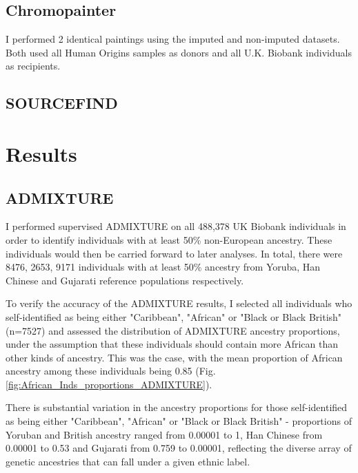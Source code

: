 \subsection{Chromopainter}

I performed 2 identical paintings using the imputed and non-imputed datasets. Both used all Human Origins samples as donors and all U.K. Biobank individuals as recipients. 

\subsection{SOURCEFIND}

\section{Results}

\subsection{ADMIXTURE}

I performed supervised ADMIXTURE on all 488,378 UK Biobank individuals in order to identify individuals with at least 50\% non-European ancestry. These individuals would then be carried forward to later analyses. In total, there were 8476, 2653, 9171 individuals with at least 50\% ancestry from Yoruba, Han Chinese and Gujarati reference populations respectively. 

To verify the accuracy of the ADMIXTURE results, I selected all individuals who self-identified as being either "Caribbean", "African" or "Black or Black British" (n=7527) and assessed the distribution of ADMIXTURE ancestry proportions, under the assumption that these individuals should contain more African than other kinds of ancestry. This was the case, with the mean proportion of African ancestry among these individuals being 0.85 (Fig. \ref{fig:African_Inds_proportions_ADMIXTURE}).

There is substantial variation in the ancestry proportions for those self-identified as being either "Caribbean", "African" or "Black or Black British" - proportions of Yoruban and British ancestry ranged from 0.00001 to 1, Han Chinese from 0.00001 to 0.53 and Gujarati from 0.759 to 0.00001, reflecting the diverse array of genetic ancestries that can fall under a given ethnic label. 


